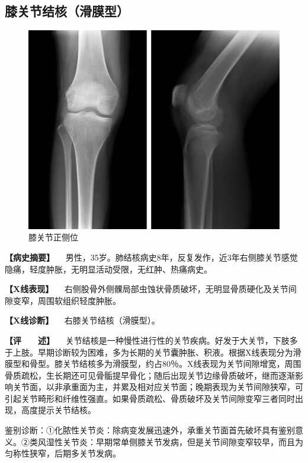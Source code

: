 \subsection{膝关节结核（滑膜型）}

\begin{figure}[!htbp]
 \centering
 \includegraphics{./images/Image00082.jpg}
 \captionsetup{justification=centering}
 \caption{膝关节正侧位}
 \label{fig2-6-7}
  \end{figure} 

\textbf{【病史摘要】}
　男性，35岁。肺结核病史8年，反复发作，近3年右侧膝关节感觉隐痛，轻度肿胀，无明显活动受限，无红肿、热痛病史。

\textbf{【X线表现】}
　右侧股骨外侧髁局部虫蚀状骨质破坏，无明显骨质硬化及关节间隙变窄，周围软组织轻度肿胀。

\textbf{【X线诊断】} 　右膝关节结核（滑膜型）。

\textbf{【评　　述】}
　关节结核是一种慢性进行性的关节疾病。好发于大关节，下肢多于上肢。早期诊断较为困难，多为长期的关节囊肿胀、积液。根据X线表现分为滑膜型和骨型。膝关节结核多为滑膜型，约占80％。X线表现为关节间隙增宽，周围骨质疏松，生长期还可见骨骺提早骨化；随后出现关节边缘骨质破坏，继而逐渐影响关节面，以非承重面为主，并累及相对应关节面；晚期表现为关节间隙狭窄，可引起关节畸形和纤维性强直。如果骨质疏松、骨质破坏及关节间隙变窄三者同时出现，高度提示关节结核。

鉴别诊断：①化脓性关节炎：除病变发展迅速外，承重关节面首先破坏具有鉴别意义。②类风湿性关节炎：早期常单侧膝关节发病，但是关节间隙变窄较早，而且为匀称性狭窄，后期多关节发病。

